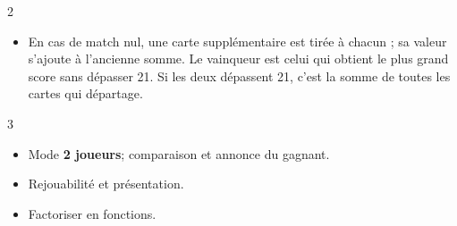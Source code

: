 \begin{UPSTICahierDesCharges}{2}
\begin{itemize}
  \item En cas de match nul, une carte supplémentaire est tirée à chacun ; sa valeur s'ajoute à l'ancienne somme. Le vainqueur est celui qui obtient le plus grand score sans dépasser 21. Si les deux dépassent 21, c'est la somme de toutes les cartes qui départage.
\end{itemize}
\end{UPSTICahierDesCharges}

\begin{UPSTICahierDesCharges}{3}
\begin{itemize}
  \item Mode \textbf{2 joueurs}; comparaison et annonce du gagnant.
  \item Rejouabilité et présentation.
  \item Factoriser en fonctions.
\end{itemize}
\end{UPSTICahierDesCharges}

